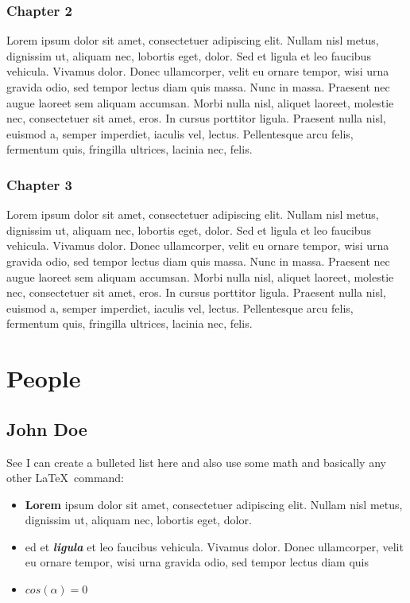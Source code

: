 \documentclass{article}
\begin{document}
\subsubsection{Chapter 2}
      


Lorem ipsum dolor sit amet, consectetuer adipiscing elit. Nullam 
nisl metus, dignissim ut, aliquam nec, lobortis eget, dolor. Sed et 
ligula et leo faucibus vehicula. Vivamus dolor. Donec ullamcorper, 
velit eu ornare tempor, wisi urna gravida odio, sed tempor lectus 
diam quis massa. Nunc in massa. Praesent nec augue laoreet 
sem aliquam accumsan. Morbi nulla nisl, aliquet laoreet, molestie 
nec, consectetuer sit amet, eros. In cursus porttitor ligula. 
Praesent nulla nisl, euismod a, semper imperdiet, iaculis vel, 
lectus. Pellentesque arcu felis, fermentum quis, fringilla ultrices, 
lacinia nec, felis.

\subsubsection{Chapter 3}
      


Lorem ipsum dolor sit amet, consectetuer adipiscing elit. Nullam 
nisl metus, dignissim ut, aliquam nec, lobortis eget, dolor. Sed et 
ligula et leo faucibus vehicula. Vivamus dolor. Donec ullamcorper, 
velit eu ornare tempor, wisi urna gravida odio, sed tempor lectus 
diam quis massa. Nunc in massa. Praesent nec augue laoreet 
sem aliquam accumsan. Morbi nulla nisl, aliquet laoreet, molestie 
nec, consectetuer sit amet, eros. In cursus porttitor ligula. 
Praesent nulla nisl, euismod a, semper imperdiet, iaculis vel, 
lectus. Pellentesque arcu felis, fermentum quis, fringilla ultrices, 
lacinia nec, felis.

\section{People}
      
\subsection{John Doe}
      


See I can create a bulleted list here and also use some math and 
basically any other \LaTeX\ command:
\begin{itemize}

	\item \textbf{Lorem }ipsum 
dolor sit amet, consectetuer adipiscing elit. 
Nullam nisl metus, dignissim ut, aliquam nec, lobortis eget, 
dolor. 
	\item ed et \textbf{\textit{ligula }}et 
leo faucibus vehicula. Vivamus dolor. Donec 
ullamcorper, velit eu ornare tempor, wisi urna gravida odio, 
sed tempor lectus diam quis 
	\item $cos(\alpha)=0$
\end{itemize}
    
\end{document}
